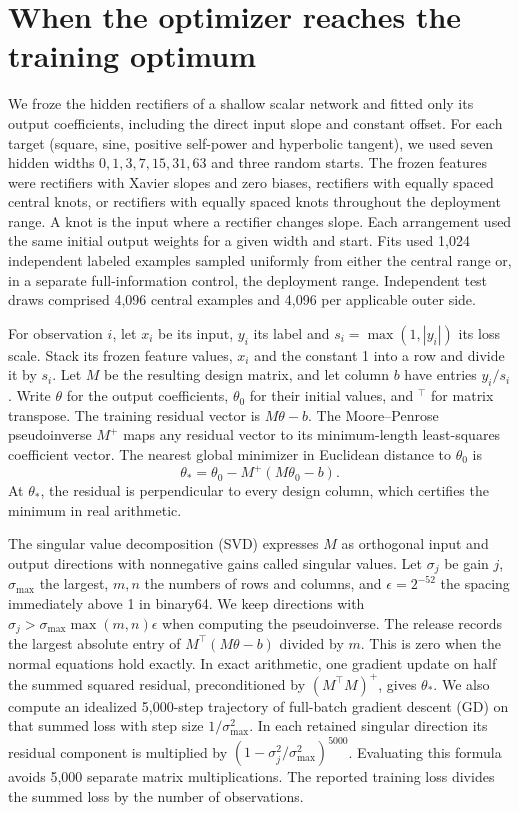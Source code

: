 \section{When the optimizer reaches the training optimum}\label{app:convex}
We froze the hidden rectifiers of a shallow scalar network and fitted only its output coefficients, including the direct input slope and constant offset. For each target (square, sine, positive self-power and hyperbolic tangent), we used seven hidden widths \(0,1,3,7,15,31,63\) and three random starts. The frozen features were rectifiers with Xavier slopes and zero biases, rectifiers with equally spaced central knots, or rectifiers with equally spaced knots throughout the deployment range. A knot is the input where a rectifier changes slope. Each arrangement used the same initial output weights for a given width and start. Fits used 1,024 independent labeled examples sampled uniformly from either the central range or, in a separate full-information control, the deployment range. Independent test draws comprised 4,096 central examples and 4,096 per applicable outer side.

For observation \(i\), let \(x_i\) be its input, \(y_i\) its label and \(s_i=\max(1,|y_i|)\) its loss scale. Stack its frozen feature values, \(x_i\) and the constant 1 into a row and divide it by \(s_i\). Let \(M\) be the resulting design matrix, and let column \(b\) have entries \(y_i/s_i\). Write \(\theta\) for the output coefficients, \(\theta_0\) for their initial values, and \({}^\top\) for matrix transpose. The training residual vector is \(M\theta-b\). The Moore--Penrose pseudoinverse \(M^+\) maps any residual vector to its minimum-length least-squares coefficient vector. The nearest global minimizer in Euclidean distance to \(\theta_0\) is
\[
             \theta_*=\theta_0-M^+(M\theta_0-b).
\]
At \(\theta_*\), the residual is perpendicular to every design column, which certifies the minimum in real arithmetic.

The singular value decomposition (SVD) expresses \(M\) as orthogonal input and output directions with nonnegative gains called singular values. Let \(\sigma_j\) be gain \(j\), \(\sigma_{\max}\) the largest, \(m,n\) the numbers of rows and columns, and \(\epsilon=2^{-52}\) the spacing immediately above 1 in binary64. We keep directions with \(\sigma_j>\sigma_{\max}\max(m,n)\epsilon\) when computing the pseudoinverse. The release records the largest absolute entry of \(M^\top(M\theta-b)\) divided by \(m\). This is zero when the normal equations hold exactly. In exact arithmetic, one gradient update on half the summed squared residual, preconditioned by \((M^\top M)^+\), gives \(\theta_*\). We also compute an idealized 5,000-step trajectory of full-batch gradient descent (GD) on that summed loss with step size \(1/\sigma_{\max}^2\). In each retained singular direction its residual component is multiplied by \((1-\sigma_j^2/\sigma_{\max}^2)^{5000}\). Evaluating this formula avoids 5,000 separate matrix multiplications. The reported training loss divides the summed loss by the number of observations.


